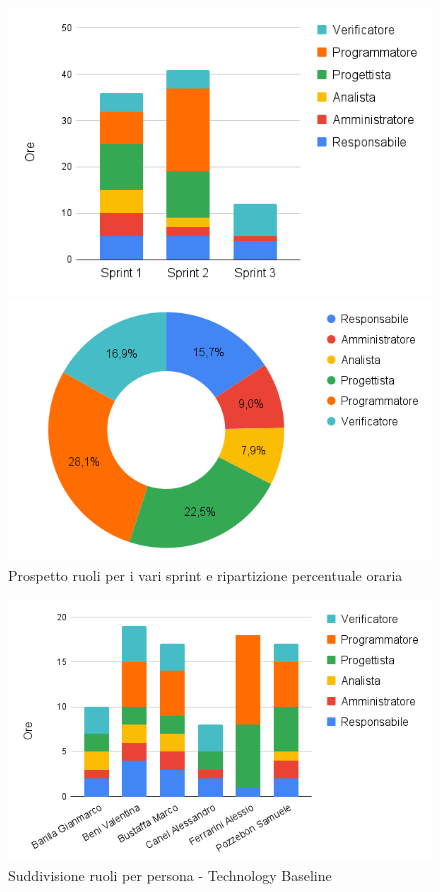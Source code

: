 \begin{figure}[h!]
	\centering
	\begin{minipage}[c]{0.3\textwidth}
    	\includegraphics[scale=0.46]{../../assets/Diagrammi_Excel/sprint_tec.png}
	\end{minipage}
\hfill
	\begin{minipage}[c]{0.46\textwidth}
		\includegraphics[scale=0.37]{../../assets/Diagrammi_Excel/torta_tec.png}
	\end{minipage}
	\caption{Prospetto ruoli per i vari sprint e ripartizione percentuale oraria}
\end{figure}

\begin{figure}[h!]
	\centering
	\includegraphics[scale=0.47]{../../assets/Diagrammi_Excel/person_tec.png}
	\caption{Suddivisione ruoli per persona - Technology Baseline}
\end{figure}
\newpage

